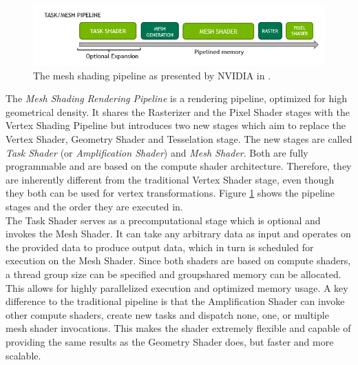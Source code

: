 \begin{figure}[h]
    \centering
    \includegraphics[width=\linewidth]{images/graphics/mesh-rendering-pipeline.png}
    \caption{The mesh shading pipeline as presented by NVIDIA in \cite{Kubisch2018}.}
    \label{fig:mesh-rendering-pipeline}
\end{figure}

\noindent
The \emph{Mesh Shading Rendering Pipeline} is a rendering pipeline, optimized for high geometrical 
density. It shares the Rasterizer and the Pixel Shader stages with the Vertex Shading Pipeline but 
introduces two new stages which aim to replace the Vertex Shader, Geometry Shader and Tesselation stage.
The new stages are called \emph{Task Shader} (or \emph{Amplification Shader}) and \emph{Mesh Shader}. Both 
are fully programmable and are based on the compute shader architecture. Therefore, they are inherently different 
from the traditional Vertex Shader stage, even though they both can be used for vertex transformations.
Figure \ref{fig:mesh-rendering-pipeline} shows the pipeline stages and the order they are executed in. \\

The Task Shader serves as a precomputational stage which is optional and invokes the Mesh Shader.
It can take any arbitrary data as input and operates on the provided data to produce output data, which in 
turn is scheduled for execution on the Mesh Shader. Since both shaders are based on compute shaders, a thread 
group size can be specified and groupshared memory can be allocated. This allows for highly parallelized execution 
and optimized memory usage. A key difference to the traditional pipeline is that the Amplification Shader can 
invoke other compute shaders, create new tasks and dispatch none, one, or multiple mesh shader invocations. This 
makes the shader extremely flexible and capable of providing the same results as the Geometry Shader does, but 
faster and more scalable.\\

